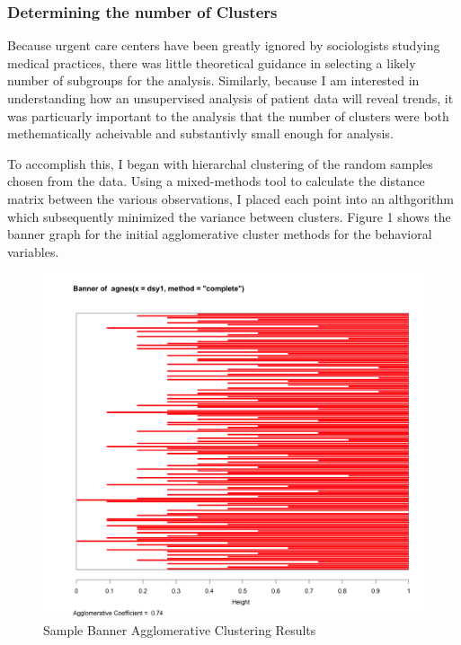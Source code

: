 \documentclass[12pt,twoside]{reedthesis}
\begin{document}
  \subsubsection*{Determining the number of
  Clusters}\label{determining-the-number-of-clusters}
  
  Because urgent care centers have been greatly ignored by sociologists
  studying medical practices, there was little theoretical guidance in
  selecting a likely number of subgroups for the analysis. Similarly,
  because I am interested in understanding how an unsupervised analysis of
  patient data will reveal trends, it was particuarly important to the
  analysis that the number of clusters were both methematically acheivable
  and substantivly small enough for analysis.
  
  To accomplish this, I began with hierarchal clustering of the random
  samples chosen from the data. Using a mixed-methods tool to calculate
  the distance matrix between the various observations, I placed each
  point into an althgorithm which subsequently minimized the variance
  between clusters. Figure 1 shows the banner graph for the initial
  agglomerative cluster methods for the behavioral variables.
  
  \begin{figure}[h!tbp]
  \centering
  \includegraphics[angle = 0,scale = 0.35]{figures/banner.png}
  \caption[Sample Banner Agglomerative Clustering Results]{\normalsize{Sample Banner Agglomerative Clustering Results}}
  \label{fig:ban1}
  \end{figure}
  
\end{document}
